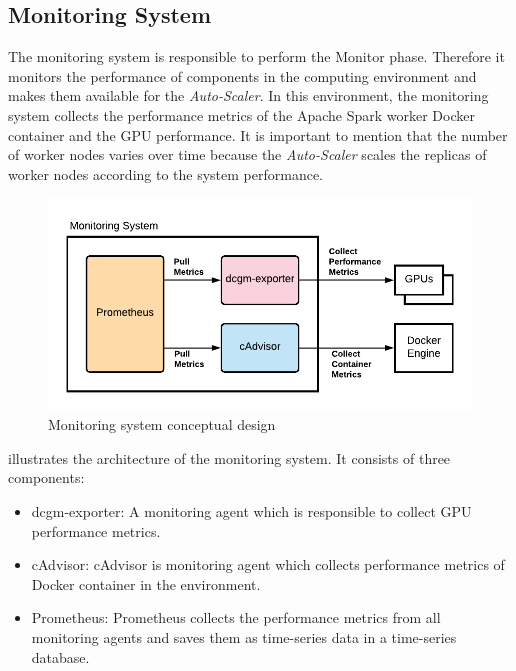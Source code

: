 \subsection{Monitoring System}
The monitoring system is responsible to perform the Monitor phase. Therefore it monitors the performance of components in the computing environment and makes them available for the \textit{Auto-Scaler}.
In this environment, the monitoring system collects the performance metrics of the Apache Spark worker Docker container and the GPU performance. It is important to mention that the number of worker nodes varies over time because the \textit{Auto-Scaler} scales the replicas of worker nodes according to the system performance.
\begin{figure}[h]
\centering
\includegraphics[scale=1]{images/05_conceptual_design/autonomic_manager/monitoring_system_concept}
\caption{Monitoring system conceptual design}
\label{fig:05_am_monitoring_concept}
\end{figure}
 illustrates the architecture of the monitoring system. It consists of three components:
\begin{itemize}
\item dcgm-exporter: A monitoring agent which is responsible to collect GPU performance metrics.
\item cAdvisor: cAdvisor is monitoring agent which collects performance metrics of Docker container in the environment.
\item Prometheus: Prometheus collects the performance metrics from all monitoring agents and saves them as time-series data in a time-series database.
\end{itemize}


